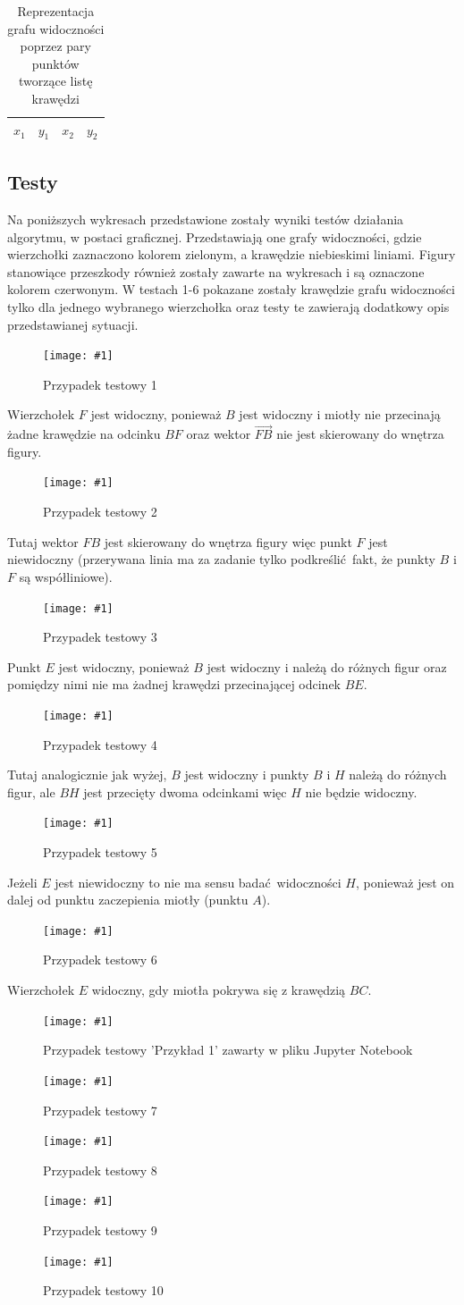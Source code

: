 \documentclass[12pt]{article}
\newcommand{\imgcustomsize}[3]{
	\begin{figure}[H]
		\centering
		\texttt{[image: \#1]}
		\caption{#2}
		\label{#1}
	\end{figure}
}
\newcommand{\tab}[2]{
\begin{table}[H]
	\centering
	\caption{#2}
	\vspace{0.3cm}
	\begin{tabular}{c|c|c|c}
		\lefthead{$x_1$}&\thead{$y_1$}&\thead{$x_2$}&\thead{$y_2$}\\
		\hline
		
	\end{tabular}
\end{table}
}
\newcommand*{\thead}[1]{\multicolumn{1}{|c}{\bfseries #1}}
\newcommand*{\lefthead}[1]{\multicolumn{1}{c}{\bfseries #1}}
\begin{document}
		\tab{res/results.txt}{Reprezentacja grafu widoczności poprzez pary punktów tworzące listę krawędzi}
		
		\newpage
		\subsection{Testy} \label{sssec:tests}
			Na poniższych wykresach przedstawione zostały wyniki testów działania algorytmu, w postaci graficznej. Przedstawiają one grafy widoczności, gdzie wierzchołki zaznaczono kolorem zielonym, a krawędzie niebieskimi liniami. Figury stanowiące przeszkody również zostały zawarte na wykresach i są oznaczone kolorem czerwonym. W testach 1-6 pokazane zostały krawędzie grafu widoczności tylko dla jednego wybranego wierzchołka oraz testy te zawierają dodatkowy opis przedstawianej sytuacji.
		
		
			\imgcustomsize{test1.jpg}{Przypadek testowy 1}{0.75}
				Wierzchołek $ F $ jest widoczny, ponieważ $ B $ jest widoczny i miotły nie przecinają żadne krawędzie na odcinku $ BF $ oraz wektor $ \overrightarrow{FB} $ nie jest skierowany do wnętrza figury.
			
			\imgcustomsize{test2.jpg}{Przypadek testowy 2}{0.75}
				Tutaj wektor $ FB $ jest skierowany do wnętrza figury więc punkt $ F $ jest niewidoczny (przerywana linia ma za zadanie tylko podkreślić fakt, że punkty $ B $ i $ F $ są współliniowe).
			
			\imgcustomsize{test3.jpg}{Przypadek testowy 3}{0.75}
				Punkt $ E $ jest widoczny, ponieważ $ B $ jest widoczny i należą do różnych figur oraz pomiędzy nimi nie ma żadnej krawędzi przecinającej odcinek $ BE $.
			
			\imgcustomsize{test4.jpg}{Przypadek testowy 4}{0.75}
				Tutaj analogicznie jak wyżej, $ B $ jest widoczny i punkty $ B $ i $ H $ należą do różnych figur, ale $ BH $ jest przecięty dwoma odcinkami więc $ H $ nie będzie widoczny.
			
			\imgcustomsize{test5.jpg}{Przypadek testowy 5}{0.75}
				Jeżeli $ E $ jest niewidoczny to nie ma sensu badać widoczności $ H $, ponieważ jest on dalej od punktu zaczepienia miotły (punktu $ A $).
			
			\imgcustomsize{test6.jpg}{Przypadek testowy 6}{0.75}
				Wierzchołek $ E $ widoczny, gdy miotła pokrywa się z krawędzią $ BC $.
			
			\imgcustomsize{przyklad1.jpg}{Przypadek testowy 'Przykład 1' zawarty w pliku Jupyter Notebook}{1}	
			\imgcustomsize{test7.jpg}{Przypadek testowy 7}{1}
			\imgcustomsize{test8.jpg}{Przypadek testowy 8}{1}
			\imgcustomsize{test9.jpg}{Przypadek testowy 9}{1}
			\imgcustomsize{test10.jpg}{Przypadek testowy 10}{1}
			\newpage
		
\end{document}
